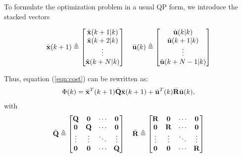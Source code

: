 \documentclass[conference]{IEEEtran} %
\begin{document}
To formulate the optimization problem in a usual QP form, we introduce the
stacked vectors

\begin{equation*}
	\bar{\bf x}(k+1) \triangleq \begin{bmatrix}
		\tilde{\bf x}(k+1|k) \\ \tilde{\bf x}(k+2|k) \\ \vdots \\ \tilde{\bf x}(k+N|k) 
	\end{bmatrix} \quad
	\bar{\bf u}(k) \triangleq \begin{bmatrix}
		\tilde{\bf u}(k|k)  \\ \tilde{\bf u}(k+1|k) \\ \vdots \\ \tilde{\bf u}(k+N-1|k)
	\end{bmatrix}
\end{equation*}

Thus, equation (\ref{eqn:cost}) can be rewritten as:
\begin{equation}\label{eqn:cost2}
	\Phi(k) = \bar{\bf x}^T(k+1)\bar{\bf Q}\bar{\bf x}(k+1) + \bar{\bf u}^T(k)\bar{\bf R}\bar{\bf u}(k),
\end{equation}
with
\begin{equation*}
	\bar {\bf Q} \triangleq \begin{bmatrix}
		{\bf Q} & {\bf 0} & \cdots & {\bf 0} \\
		{\bf 0} & {\bf Q} & \cdots & {\bf 0} \\
		\vdots  & \vdots  & \ddots & \vdots  \\
		{\bf 0} & {\bf 0} & \cdots & {\bf Q}
	\end{bmatrix} \quad
	\bar {\bf R} \triangleq \begin{bmatrix}
		{\bf R} & {\bf 0} & \cdots & {\bf 0} \\
		{\bf 0} & {\bf R} & \cdots & {\bf 0} \\
		\vdots  & \vdots  & \ddots & \vdots  \\
		{\bf 0} & {\bf 0} & \cdots & {\bf R}
	\end{bmatrix}
\end{equation*}
\end{document}
